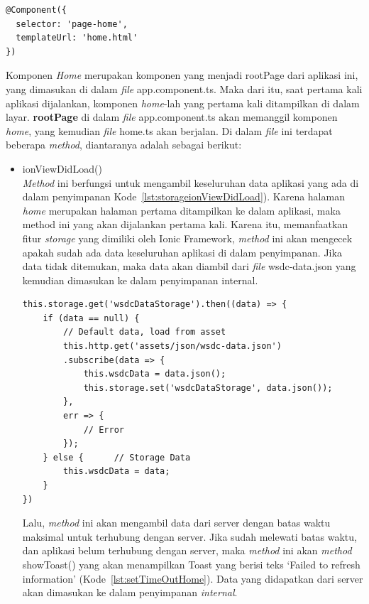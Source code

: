 \begin{itemize}
\begin{lstlisting}[language=html, label={lst:componenthome}, caption=@Component pada home.ts]
@Component({
  selector: 'page-home',
  templateUrl: 'home.html'
})
\end{lstlisting}	
	
	Komponen \textit{Home} merupakan komponen yang menjadi rootPage dari aplikasi ini, yang dimasukan di dalam \textit{file} app.component.ts. Maka dari itu, saat pertama kali aplikasi dijalankan, komponen \textit{home}-lah yang pertama kali ditampilkan di dalam layar. \textbf{rootPage} di dalam \textit{file} app.component.ts akan memanggil komponen \textit{home}, yang kemudian \textit{file} home.ts akan berjalan. Di dalam \textit{file} ini terdapat beberapa \textit{method}, diantaranya adalah sebagai berikut:
	
	\begin{itemize}
		\item ionViewDidLoad() \\
		\textit{Method} ini berfungsi untuk mengambil keseluruhan data aplikasi yang ada di dalam penyimpanan Kode~\ref{lst:storageionViewDidLoad}). Karena halaman \textit{home} merupakan halaman pertama ditampilkan ke dalam aplikasi, maka method ini yang akan dijalankan pertama kali. Karena itu, memanfaatkan fitur \textit{storage} yang dimiliki oleh Ionic Framework, \textit{method} ini akan mengecek apakah sudah ada data keseluruhan aplikasi di dalam penyimpanan. Jika data tidak ditemukan, maka data akan diambil dari \textit{file} wsdc-data.json yang kemudian dimasukan ke dalam penyimpanan internal.
		\newpage
	\begin{lstlisting}[language=html, label={lst:storageionViewDidLoad}, caption=Storage pada ionViewDidLoad()]
this.storage.get('wsdcDataStorage').then((data) => {
	if (data == null) {
		// Default data, load from asset
		this.http.get('assets/json/wsdc-data.json')
		.subscribe(data => {
			this.wsdcData = data.json();
			this.storage.set('wsdcDataStorage', data.json());
		},
		err => {
			// Error
		});
	} else {      // Storage Data
		this.wsdcData = data;
	}
})
\end{lstlisting}
		Lalu, \textit{method} ini akan mengambil data dari server dengan batas waktu maksimal untuk terhubung dengan server. Jika sudah melewati batas waktu, dan aplikasi belum terhubung dengan server, maka \textit{method} ini akan \textit{method} showToast() yang akan menampilkan Toast yang berisi teks `Failed to refresh information' (Kode~\ref{lst:setTimeOutHome}). Data yang didapatkan dari server akan dimasukan ke dalam penyimpanan \textit{internal}.

\end{itemize}
\end{itemize}
